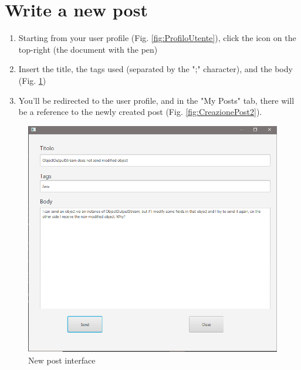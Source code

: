 \documentclass[11pt]{report}
\begin{document}
\section{Write a new post}
\begin{enumerate}
    \item Starting from your user profile (Fig. \ref{fig:ProfiloUtente}), click the icon on the top-right (the document with the pen)
    \item Insert the title, the tags used (separated by the ";" character), and the body (Fig. \ref{fig:CreazionePost1})
    \item You'll be redirected to the user profile, and in the "My Posts" tab, there will be a reference to the newly created post (Fig. \ref{fig:CreazionePost2}).
\end{enumerate}
\begin{figure}[H]
  \centering
  \includegraphics[width=\textwidth,keepaspectratio=true]{img/user_manual/CreazionePost1.png}
  \caption{New post interface}
  \label{fig:CreazionePost1}
\end{figure}
\end{document}
